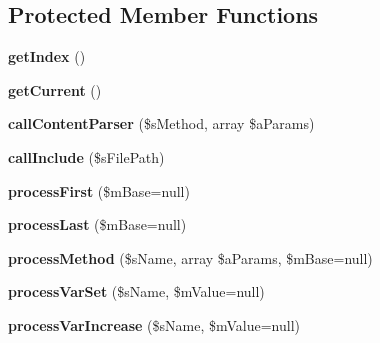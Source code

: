\subsection*{Protected Member Functions}
\begin{DoxyCompactItemize}
\item 
\hypertarget{class_i_p_c_o___processor_a955f0ee8c0f493b97389476225ae441b}{{\bfseries get\-Index} ()}\label{class_i_p_c_o___processor_a955f0ee8c0f493b97389476225ae441b}

\item 
\hypertarget{class_i_p_c_o___processor_a888308dd7eb0095b430a5f3a898bf7a4}{{\bfseries get\-Current} ()}\label{class_i_p_c_o___processor_a888308dd7eb0095b430a5f3a898bf7a4}

\item 
\hypertarget{class_i_p_c_o___processor_a6fcb27ef8b7d6f10943d465f20ac746c}{{\bfseries call\-Content\-Parser} (\$s\-Method, array \$a\-Params)}\label{class_i_p_c_o___processor_a6fcb27ef8b7d6f10943d465f20ac746c}

\item 
\hypertarget{class_i_p_c_o___processor_a2d18c15461f563b39b79edddd116ef8d}{{\bfseries call\-Include} (\$s\-File\-Path)}\label{class_i_p_c_o___processor_a2d18c15461f563b39b79edddd116ef8d}

\item 
\hypertarget{class_i_p_c_o___processor_a178df4a527169b493253b62dbe748b3d}{{\bfseries process\-First} (\$m\-Base=null)}\label{class_i_p_c_o___processor_a178df4a527169b493253b62dbe748b3d}

\item 
\hypertarget{class_i_p_c_o___processor_a3d59fa1984e482318b04bf2b93177d15}{{\bfseries process\-Last} (\$m\-Base=null)}\label{class_i_p_c_o___processor_a3d59fa1984e482318b04bf2b93177d15}

\item 
\hypertarget{class_i_p_c_o___processor_a080dc031caa6bb8293214e617149c415}{{\bfseries process\-Method} (\$s\-Name, array \$a\-Params, \$m\-Base=null)}\label{class_i_p_c_o___processor_a080dc031caa6bb8293214e617149c415}

\item 
\hypertarget{class_i_p_c_o___processor_a654d2d6465283c53ee639936dc86c2fb}{{\bfseries process\-Var\-Set} (\$s\-Name, \$m\-Value=null)}\label{class_i_p_c_o___processor_a654d2d6465283c53ee639936dc86c2fb}

\item 
\hypertarget{class_i_p_c_o___processor_ad5b220ae774d4d11a218cfaae2cff94c}{{\bfseries process\-Var\-Increase} (\$s\-Name, \$m\-Value=null)}\label{class_i_p_c_o___processor_ad5b220ae774d4d11a218cfaae2cff94c}


\end{DoxyCompactItemize}

